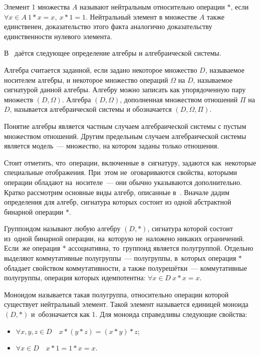 Элемент 1 множества $A$ называют нейтральным относительно операции $*$, если $\forall x\in A\ 1*x=x,\ x*1=1$.
Нейтральный элемент в множестве $A$ также единственен, доказательство этого факта аналогично доказательству единственности нулевого элемента.

В~\cite{Bauman_DM, Adelson_Velskiy} даётся следующее определение алгебры и алгебраической системы.
\begin{mydef}
Алгебра считается заданной, если задано некоторое множество $D$, называемое носителем алгебры, и некоторое множество операций $\Omega $ на $D$, называемое сигнатурой данной алгебры. Алгебру можно записать как упорядоченную пару множеств $\left( D,\Omega  \right)$. Алгебра $\left(D, \Omega \right)$, дополненная множеством отношений $\Pi$ на $D$, называется алгебраической системы и обозначается $\left(D, \Omega, \Pi \right)$.
\end{mydef}
Понятие алгебры является частным случаем алгебраической системы с пустым множеством отношений. Другим предельным случаем алгебраической системы является модель~--- множество, на котором заданы только отношения.

Стоит отметить, что~операции, включенные в~сигнатуру, задаются как~некоторые специальные отображения. При~этом не~оговариваются свойства, которыми операции обладают на~носителе~--– они обычно указываются дополнительно.
Кратко рассмотрим основные виды алгебр, описанные в~\cite{Bauman_DM, Adelson_Velskiy, Voevodin}. Вначале дадим определения для алгебр, сигнатура которых состоит из одной абстрактной бинарной операции $*$.

Группоидом называют любую алгебру $\left( D,* \right)$, сигнатура которой состоит из~одной бинарной операции, на~которую не~наложено никаких ограничений. Если~же операция $*$ ассоциативна, то~группоид является полугруппой. Отдельно выделяют коммутативные полугруппы~--– полугруппы, в~которых операция $*$ обладает свойством коммутативности, а также полурешётки~--- коммутативные полугруппы, операция которых идемпотентна: $\forall x \in D \ x*x=x$.

Моноидом называется такая полугруппа, относительно операции которой существует нейтральный элемент. Такой элемент называется единицей моноида $\left( D,* \right)$ и~обозначается как 1. Для моноида справедливы следующие свойства:
\begin{itemize}
	\item $\forall x,y,z\in D\quad x*\left( y*z \right)=\left( x*y \right)*z$;
	\item $\forall x\in D\quad x*1=1*x=x$.
\end{itemize}

